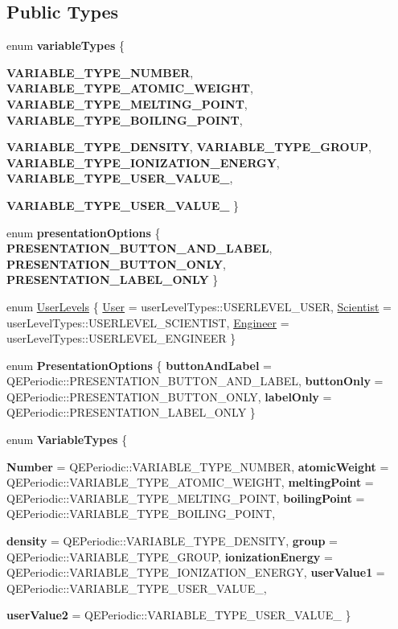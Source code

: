 \subsection*{Public Types}
\begin{DoxyCompactItemize}
\item 
enum {\bfseries variableTypes} \{ \par
{\bfseries VARIABLE\_\-TYPE\_\-NUMBER}, 
{\bfseries VARIABLE\_\-TYPE\_\-ATOMIC\_\-WEIGHT}, 
{\bfseries VARIABLE\_\-TYPE\_\-MELTING\_\-POINT}, 
{\bfseries VARIABLE\_\-TYPE\_\-BOILING\_\-POINT}, 
\par
{\bfseries VARIABLE\_\-TYPE\_\-DENSITY}, 
{\bfseries VARIABLE\_\-TYPE\_\-GROUP}, 
{\bfseries VARIABLE\_\-TYPE\_\-IONIZATION\_\-ENERGY}, 
{\bfseries VARIABLE\_\-TYPE\_\-USER\_\-VALUE\_}, 
\par
{\bfseries VARIABLE\_\-TYPE\_\-USER\_\-VALUE\_}
 \}
\item 
enum {\bfseries presentationOptions} \{ {\bfseries PRESENTATION\_\-BUTTON\_\-AND\_\-LABEL}, 
{\bfseries PRESENTATION\_\-BUTTON\_\-ONLY}, 
{\bfseries PRESENTATION\_\-LABEL\_\-ONLY}
 \}
\item 
enum \hyperlink{classQEPeriodic_a24429d342ac647985717bc5cb6a3d912}{UserLevels} \{ \hyperlink{classQEPeriodic_a24429d342ac647985717bc5cb6a3d912a6e980ae81c92f61ab7bf8435a47341aa}{User} =  userLevelTypes::USERLEVEL\_\-USER, 
\hyperlink{classQEPeriodic_a24429d342ac647985717bc5cb6a3d912a963e323c81970c23006990c1aefff43b}{Scientist} =  userLevelTypes::USERLEVEL\_\-SCIENTIST, 
\hyperlink{classQEPeriodic_a24429d342ac647985717bc5cb6a3d912aec2ea9e97c918bf0353f56aa55a00612}{Engineer} =  userLevelTypes::USERLEVEL\_\-ENGINEER
 \}
\item 
enum {\bfseries PresentationOptions} \{ {\bfseries buttonAndLabel} =  QEPeriodic::PRESENTATION\_\-BUTTON\_\-AND\_\-LABEL, 
{\bfseries buttonOnly} =  QEPeriodic::PRESENTATION\_\-BUTTON\_\-ONLY, 
{\bfseries labelOnly} =  QEPeriodic::PRESENTATION\_\-LABEL\_\-ONLY
 \}
\item 
enum {\bfseries VariableTypes} \{ \par
{\bfseries Number} =  QEPeriodic::VARIABLE\_\-TYPE\_\-NUMBER, 
{\bfseries atomicWeight} =  QEPeriodic::VARIABLE\_\-TYPE\_\-ATOMIC\_\-WEIGHT, 
{\bfseries meltingPoint} =  QEPeriodic::VARIABLE\_\-TYPE\_\-MELTING\_\-POINT, 
{\bfseries boilingPoint} =  QEPeriodic::VARIABLE\_\-TYPE\_\-BOILING\_\-POINT, 
\par
{\bfseries density} =  QEPeriodic::VARIABLE\_\-TYPE\_\-DENSITY, 
{\bfseries group} =  QEPeriodic::VARIABLE\_\-TYPE\_\-GROUP, 
{\bfseries ionizationEnergy} =  QEPeriodic::VARIABLE\_\-TYPE\_\-IONIZATION\_\-ENERGY, 
{\bfseries userValue1} =  QEPeriodic::VARIABLE\_\-TYPE\_\-USER\_\-VALUE\_, 
\par
{\bfseries userValue2} =  QEPeriodic::VARIABLE\_\-TYPE\_\-USER\_\-VALUE\_
 \}
\end{DoxyCompactItemize}

